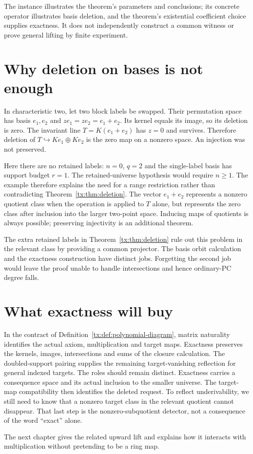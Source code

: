 The instance illustrates the theorem's parameters and conclusions;
its concrete operator illustrates basis deletion, and the theorem's
existential coefficient choice supplies exactness. It does not
independently construct a common witness or prove general lifting
by finite experiment.

\section{Why deletion on bases is not enough}
In characteristic two, let two block labels be swapped. Their permutation
space has basis $e_1,e_2$ and $z e_1=z e_2=e_1+e_2$. Its kernel equals
its image, so its deletion is zero. The invariant line
$T=K(e_1+e_2)$ has $z=0$ and survives. Therefore deletion of
$T\hookrightarrow Ke_1\oplus Ke_2$ is the zero map on a nonzero space.
An injection was not preserved.

Here there are no retained labels: $n=0$, $q=2$ and the single-label
basis has support budget $r=1$. The retained-universe hypothesis would
require $n\ge1$. The example therefore explains the need for a
range restriction rather than contradicting Theorem~\ref{tx:thm:deletion}.
The vector $e_1+e_2$ represents a nonzero quotient class when
the operation is applied to $T$ alone, but represents the zero
class after inclusion into the larger two-point space. Inducing
maps of quotients is always possible; preserving injectivity is
an additional theorem.

The extra retained labels in Theorem~\ref{tx:thm:deletion} rule out
this problem in the relevant class by providing a common projector.
The basis orbit calculation and the exactness construction have distinct
jobs. Forgetting the second job would leave the proof unable to handle
intersections and hence ordinary-PC degree falls.

\section{What exactness will buy}
In the contract of Definition~\ref{tx:def:polynomial-diagram}, matrix
naturality identifies the actual axiom, multiplication and target maps.
Exactness preserves the kernels, images, intersections and sums of the
closure calculation. The doubled-support pairing supplies the remaining
target-vanishing reflection for general indexed targets.
The roles should remain distinct. Exactness carries a consequence
space and its actual inclusion to the smaller universe. The target-map
compatibility then identifies the deleted request. To reflect
underivability, we still need to know that a nonzero target class
in the relevant quotient cannot disappear. That last step is the
nonzero-subquotient detector, not a consequence of the word
``exact'' alone.

The next chapter gives the related upward lift and explains how it
interacts with multiplication without pretending to be a ring map.
